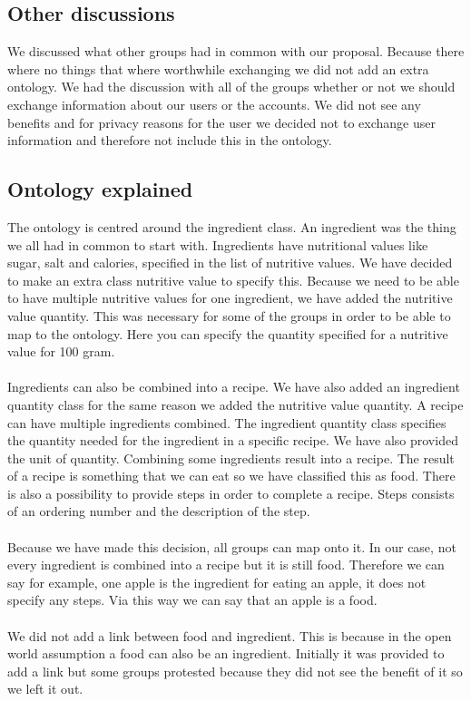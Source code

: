\subsection{Other discussions}
We discussed what other groups had in common with our proposal. Because there where no things that where worthwhile exchanging we did not add an extra ontology.
\newline
\newline
\noindent
We had the discussion with all of the groups whether or not we should exchange information about our users or the accounts. We did not see any benefits and for privacy reasons for the user we decided not to exchange user information and therefore not include this in the ontology.  
\subsection{Ontology explained}
The ontology is centred around the ingredient class. An ingredient was the thing we all had in common to start with. Ingredients have nutritional values like sugar, salt and calories, specified in the list of nutritive values. We have decided to make an extra class nutritive value to specify this. Because we need to be able to have multiple nutritive values for one ingredient, we have added the nutritive value quantity. This was necessary for some of the groups in order to be able to map to the ontology. Here you can specify the quantity specified for a nutritive value for 100 gram.
\\ \\
Ingredients can also be combined into a recipe. We have also added an ingredient quantity class for the same reason we added the nutritive value quantity. A recipe can have multiple ingredients combined. The ingredient quantity class specifies the quantity needed for the ingredient in a specific recipe. We have also provided the unit of quantity. Combining some ingredients result into a recipe. The result of a recipe is something that we can eat so we have classified this as food. There is also a possibility to provide steps in order to complete a recipe. Steps consists of an ordering number and the description of the step. 
\\ \\
Because we have made this decision, all groups can map onto it. In our case, not every ingredient is combined into a recipe but it is still food. Therefore we can say for example, one apple is the ingredient for eating an apple, it does not specify any steps. Via this way we can say that an apple is a food.
\\ \\
We did not add a link between food and ingredient. This is because in the open world assumption a food can also be an ingredient. Initially it was provided to add a link but some groups protested because they did not see the benefit of it so we left it out. 

